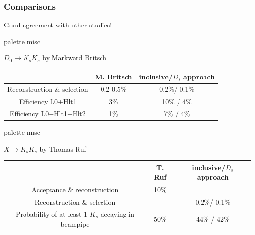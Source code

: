 \documentclass{beamer}
\begin{document}
\LogoOff
\begin{frame}
\frametitle{Comparisons }
\vspace*{-.4cm}
Good agreement with other studies!
\begin{beamercolorbox}[rounded=true,shadow=true]{palette misc}
\begin{center}
$D_0 \rightarrow K_sK_s$ by Markward Britsch\\
\vspace*{.5cm}
\scriptsize
\begin{tabular}{c|c|c}
 & M. Britsch & inclusive/$D_s$ approach \\ 
\hline 
Reconstruction \& selection  & 0.2-0.5\% & 0.2\%/ 0.1\% \\ 
\hline 
Efficiency L0+Hlt1 & 3\% & 10\% / 4\%\\ 
\hline 
Efficiency L0+Hlt1+Hlt2 & 1\% & 7\% / 4\%\\ 
\end{tabular} 

\end{center}


\end{beamercolorbox}
\begin{beamercolorbox}[rounded=true,shadow=true]{palette misc}
\begin{center}
$X\rightarrow K_sK_s$ by Thomas Ruf\\
\vspace*{.5cm}
\scriptsize
\begin{tabular}{c|c|c}
 & T. Ruf & inclusive/$D_s$ approach \\ 
\hline 
Acceptance \& reconstruction & 10\% &  \\ 
Reconstruction \& selection  & & 0.2\%/ 0.1\% \\ 
\hline 
Probability of at least 1 $K_s$ decaying in beampipe & 50\% & 44\% / 42\%\\ 
\end{tabular} 
\end{center}


\end{beamercolorbox}

\end{frame}
\LogoOn
\end{document}

